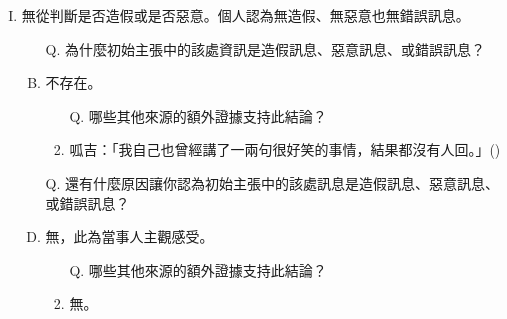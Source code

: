 \documentclass[a4paper, 12pt]{article}
\begin{document}
\begin{enumerate}[I.]
    \item 無從判斷是否造假或是否惡意。個人認為無造假、無惡意也無錯誤訊息。
          \begin{enumerate}[A.]
              \item [Q.] 為什麼{\color{blue}初始主張}中的該處資訊是造假訊息、惡意訊息、或錯誤訊息？
              \item 不存在。
                    \begin{enumerate}[1.]
                        \item [Q.] 哪些其他來源的額外證據支持此結論？
                        \item 呱吉：「我自己也曾經講了一兩句很好笑的事情，結果都沒有人回。」(\cite{eFs8bNzDAHg7227s})
                    \end{enumerate}
              \item [Q.] 還有什麼原因讓你認為{\color{blue}初始主張}中的該處訊息是造假訊息、惡意訊息、或錯誤訊息？
              \item 無，此為當事人主觀感受。
                    \begin{enumerate}[1.]
                        \item [Q.] 哪些其他來源的額外證據支持此結論？
                        \item 無。
                    \end{enumerate}
          \end{enumerate}
\end{enumerate}

\printbibliography[title=參考文獻]
\end{document}
